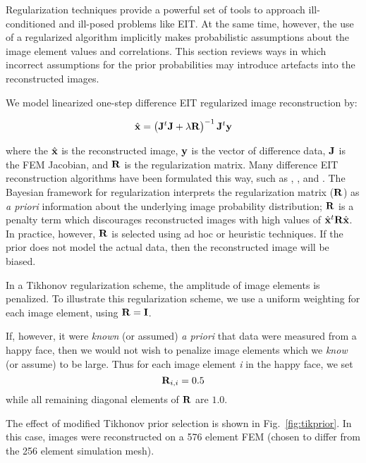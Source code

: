 \documentclass[12pt]{iopart}
\begin{document}
Regularization techniques provide a powerful set of tools
to approach ill-conditioned and ill-posed problems like
EIT. At the same time, however, the use of a regularized
algorithm implicitly makes probabilistic assumptions
about the image element values and correlations. 
This section reviews ways in which incorrect assumptions for
the prior probabilities may introduce artefacts into 
the reconstructed images.

We model linearized one-step difference
EIT regularized image reconstruction
by:

\begin{equation}
   \hat{\bf x} = 
   \left({\bf J}^t{\bf J} + \lambda{\bf R}\right)^{-1}
         {\bf J}^t{\bf y}
\end{equation}

where the $\hat{\bf x}$ is the reconstructed image, 
$\bf y$ is the vector of difference data,
$\bf J$ is the FEM Jacobian, 
and $\bf R$ is the regularization matrix. Many 
difference EIT reconstruction algorithms have been
formulated this way, such as
\cite{Cheney_etal_1990}, \cite{Adler_and_Guardo_1996},
and \cite{Polydorides_2002}.
The Bayesian framework for regularization interprets
the regularization matrix ($\bf R$) as {\em a priori} information 
about the underlying image probability distribution;
$\bf R$ is a penalty term which discourages reconstructed
images with high values of $\hat{\bf x}^t{\bf R}\hat{\bf x}$.
In practice, however, $\bf R$ is selected using
ad hoc or heuristic techniques. If the prior does
not model the actual data, then the reconstructed
image will be biased.

In a Tikhonov regularization scheme, the amplitude
of image elements is penalized. To illustrate
this regularization scheme, we use a uniform
weighting for each image element, using ${\bf R} = {\bf I}$.

If, however, it were {\em known} (or assumed) {\em a priori} that 
data were measured from a happy face, then we 
would not wish to penalize image elements which we
{\em know} (or assume) to be large. Thus for each image element {\em i}
in the happy face, we set 
\begin{equation}
   {\bf R}_{i,i} = 0.5
\end{equation}
while all remaining diagonal elements of $\bf R$ are $1.0$.

The effect of modified Tikhonov prior selection is shown in
Fig.~\ref{fig:tikprior}.
In this case, images were reconstructed on a 576 element
FEM (chosen to differ from the 256 element simulation mesh).
\end{document}
